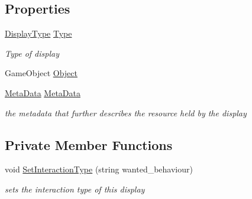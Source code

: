 \subsection*{Properties}
\begin{DoxyCompactItemize}
\item 
\mbox{\hyperlink{class_display_a7f7abc559192ef7e8f4a03382d3492d7}{Display\+Type}} \mbox{\hyperlink{class_display_a2c80ba13fff1fd81aaa6915b28e8c14f}{Type}}
\begin{DoxyCompactList}\small\item\em Type of display \end{DoxyCompactList}\item 
Game\+Object \mbox{\hyperlink{class_display_a32b9644a140d330a9c51cfdbb6f6093c}{Object}}
\item 
\mbox{\hyperlink{class_meta_data}{Meta\+Data}} \mbox{\hyperlink{class_display_a9ae693bcb1553822aed7ae887a65591c}{Meta\+Data}}
\begin{DoxyCompactList}\small\item\em the metadata that further describes the resource held by the display \end{DoxyCompactList}\end{DoxyCompactItemize}
\subsection*{Private Member Functions}
\begin{DoxyCompactItemize}
\item 
void \mbox{\hyperlink{class_display_af8aa8a663725645f431095397ad802e6}{Set\+Interaction\+Type}} (string wanted\+\_\+behaviour)
\begin{DoxyCompactList}\small\item\em sets the interaction type of this display \end{DoxyCompactList}\end{DoxyCompactItemize}
